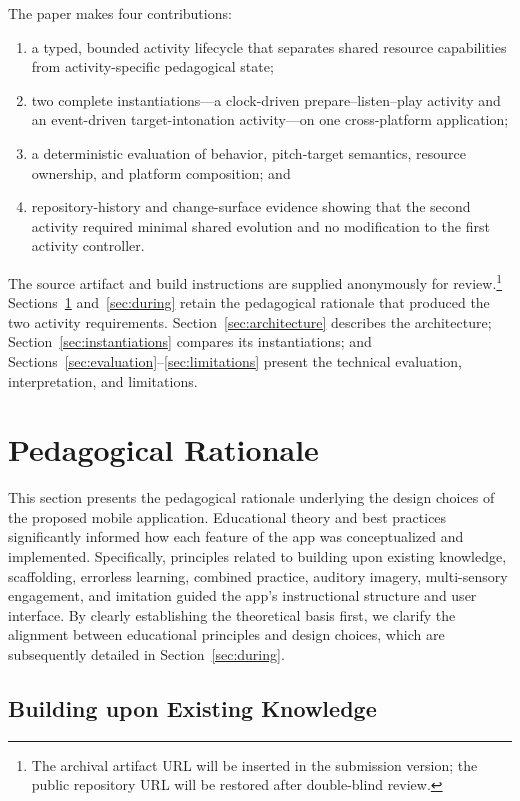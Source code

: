 \documentclass[runningheads]{llncs}
\begin{document}
The paper makes four contributions:
\begin{enumerate}
  \item a typed, bounded activity lifecycle that separates shared resource
  capabilities from activity-specific pedagogical state;
  \item two complete instantiations---a clock-driven prepare--listen--play
  activity and an event-driven target-intonation activity---on one
  cross-platform application;
  \item a deterministic evaluation of behavior, pitch-target semantics,
  resource ownership, and platform composition; and
  \item repository-history and change-surface evidence showing that the second
  activity required minimal shared evolution and no modification to the first
  activity controller.
\end{enumerate}
The source artifact and build instructions are supplied anonymously for
review.\footnote{The archival artifact URL will be inserted in the submission
version; the public repository URL will be restored after double-blind
review.} Sections~\ref{sec:rationale} and~\ref{sec:during} retain the
pedagogical rationale that produced the two activity requirements.
Section~\ref{sec:architecture} describes the architecture;
Section~\ref{sec:instantiations} compares its instantiations; and
Sections~\ref{sec:evaluation}--\ref{sec:limitations} present the technical
evaluation, interpretation, and limitations.


\section{Pedagogical Rationale}
\label{sec:rationale}

This section presents the pedagogical rationale underlying the design choices of the proposed mobile application. Educational theory and best practices significantly informed how each feature of the app was conceptualized and implemented. Specifically, principles related to building upon existing knowledge, scaffolding, errorless learning, combined practice, auditory imagery, multi-sensory engagement, and imitation guided the app’s instructional structure and user interface. By clearly establishing the theoretical basis first, we clarify the alignment between educational principles and design choices, which are subsequently detailed in Section~\ref{sec:during}.


\subsection{Building upon Existing Knowledge}
\label{sec:starting_known}
\end{document}
